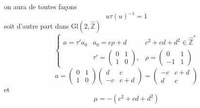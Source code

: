 \margin{$\unsure{\wedge}$}


on aura de toutes façons
\[
u\tau(u)^{-1}=1
\]
soit d'autre part dans $\mathrm{Gl}(2,\widehat{\mathbb Z})$
\[
\tag{96}
\left\{\begin{array}{lll}
a=\tau'a_0&a_0=c\rho+d&c^2+cd+d^2\in\widehat{\mathbb Z}^{*}\\[3pt]
&\tau'=\begin{pmatrix}0&1\\1&0\end{pmatrix},&
\rho=\begin{pmatrix}0&1\\-1&1\end{pmatrix}
\end{array}\right.
\]
\[
\tag{97}
a=\begin{pmatrix}0&1\\1&0\end{pmatrix}
\begin{pmatrix}d&c\\-c&c+d\end{pmatrix}
=\begin{pmatrix}-c&c+d\\d&c\end{pmatrix}
\]
et
\[
\tag{98}
\mu=-(c^2+cd+d^2)
\]


